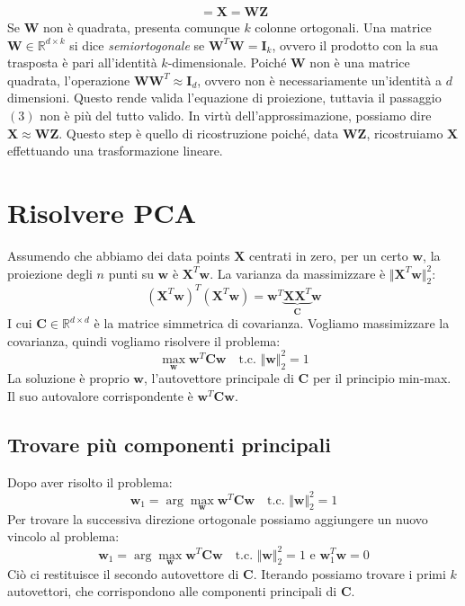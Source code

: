 \documentclass{article}
\begin{document}
            \begin{eqnarray}
                = \mathbf{X} = \mathbf{WZ}
            \end{eqnarray}
            Se $\mathbf{W}$ non è quadrata, presenta comunque $k$ colonne ortogonali. Una matrice $\mathbf{W} \in 
            \mathbb{R}^{d \times k}$ si dice \emph{semiortogonale} se $\mathbf{W}^T\mathbf{W} = \mathbf{I}_k$, ovvero il prodotto con 
            la sua trasposta è pari all'identità $k$-dimensionale. Poiché $\mathbf{W}$ non è una matrice quadrata, 
            l'operazione $\mathbf{WW}^T \approx \mathbf{I}_d$, ovvero non è necessariamente un'identità a $d$ dimensioni.
            Questo rende valida l'equazione di proiezione, tuttavia il passaggio $(3)$ non è più del tutto valido. In virtù 
            dell'approssimazione, possiamo dire $\mathbf{X} \approx \mathbf{WZ}$. Questo step è quello di ricostruzione poiché,
            data $\mathbf{WZ}$, ricostruiamo $\mathbf{X}$ effettuando una trasformazione lineare.
        \section{Risolvere PCA}
            Assumendo che abbiamo dei data points $\mathbf{X}$ centrati in zero, per un certo $\mathbf{w}$, la proiezione degli 
            $n$ punti su $\mathbf{w}$ è $\mathbf{X}^T\mathbf{w}$. La varianza da massimizzare è $\Vert \mathbf{X}^T\mathbf{w} \Vert_2^2$:
            \[(\mathbf{X}^T\mathbf{w})^T (\mathbf{X}^T \mathbf{w}) = \mathbf{w}^T \underbrace{\mathbf{XX}^T}_{\mathbf{C}}\mathbf{w}\]
            I cui $\mathbf{C} \in \mathbb{R}^{d \times d}$ è la matrice simmetrica di covarianza. Vogliamo massimizzare la covarianza, quindi 
            vogliamo risolvere il problema:
            \[\max_\mathbf{w} \mathbf{w}^T\mathbf{Cw} \quad \text{t.c. }\Vert \mathbf{w} \Vert^2_2 = 1\]
            La soluzione è proprio $\mathbf{w}$, l'autovettore principale di $\mathbf{C}$ per il principio min-max. Il suo autovalore 
            corrispondente è $\mathbf{w}^T\mathbf{Cw}$.
            \subsection{Trovare più componenti principali}
                Dopo aver risolto il problema: 
                \[\mathbf{w}_1 = \arg \max_\mathbf{w} \mathbf{w}^T\mathbf{Cw} \quad \text{t.c. }\Vert \mathbf{w} \Vert^2_2 = 1\]
                Per trovare la successiva direzione ortogonale possiamo aggiungere un nuovo vincolo al problema:
                \[\mathbf{w}_1 = \arg \max_\mathbf{w} \mathbf{w}^T\mathbf{Cw} \quad \text{t.c. }\Vert \mathbf{w} \Vert^2_2 = 1 \text{ e }\mathbf{w}_1^T\mathbf{w} = 0\]
                Ciò ci restituisce il secondo autovettore di $\mathbf{C}$. Iterando possiamo trovare i primi $k$ autovettori, che corrispondono 
                alle componenti principali di $\mathbf{C}$.
\end{document}
